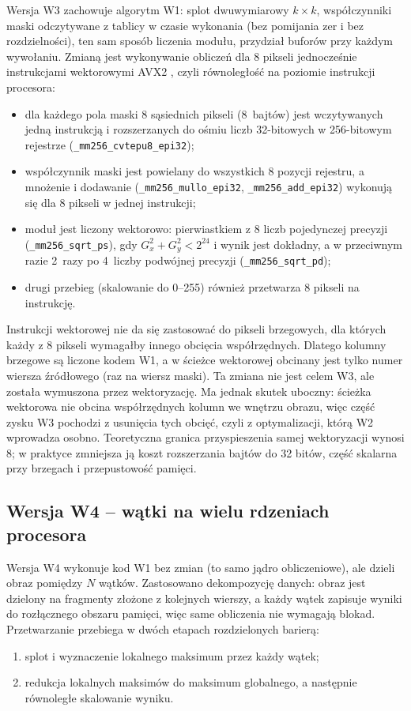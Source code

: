 \documentclass[12pt,a4paper]{article}
\newcommand{\kod}[1]{\texttt{#1}}
\begin{document}
Wersja W3 zachowuje algorytm W1: splot dwuwymiarowy $k \times k$, współczynniki maski odczytywane z tablicy w czasie wykonania (bez pomijania zer i bez rozdzielności), ten sam sposób liczenia modułu, przydział buforów przy każdym wywołaniu. Zmianą jest wykonywanie obliczeń dla 8 pikseli jednocześnie instrukcjami wektorowymi AVX2 \cite{intel}, czyli równoległość na poziomie instrukcji procesora:
\begin{itemize}
	\item dla każdego pola maski 8 sąsiednich pikseli (8~bajtów) jest wczytywanych jedną instrukcją i rozszerzanych do ośmiu liczb 32-bitowych w 256-bitowym rejestrze (\kod{\_mm256\_\allowbreak{}cvtepu8\_epi32});
	\item współczynnik maski jest powielany do wszystkich 8 pozycji rejestru, a mnożenie i dodawanie (\kod{\_mm256\_\allowbreak{}mullo\_epi32}, \kod{\_mm256\_\allowbreak{}add\_epi32}) wykonują się dla 8 pikseli w jednej instrukcji;
	\item moduł jest liczony wektorowo: pierwiastkiem z 8 liczb pojedynczej precyzji (\kod{\_mm256\_\allowbreak{}sqrt\_ps}), gdy $G_x^2 + G_y^2 < 2^{24}$ i wynik jest dokładny, a w przeciwnym razie 2~razy po 4~liczby podwójnej precyzji (\kod{\_mm256\_\allowbreak{}sqrt\_pd});
	\item drugi przebieg (skalowanie do 0--255) również przetwarza 8 pikseli na instrukcję.
\end{itemize}
Instrukcji wektorowej nie da się zastosować do pikseli brzegowych, dla których każdy z 8 pikseli wymagałby innego obcięcia współrzędnych. Dlatego kolumny brzegowe są liczone kodem W1, a w ścieżce wektorowej obcinany jest tylko numer wiersza źródłowego (raz na wiersz maski). Ta zmiana nie jest celem W3, ale została wymuszona przez wektoryzację. Ma jednak skutek uboczny: ścieżka wektorowa nie obcina współrzędnych kolumn we wnętrzu obrazu, więc część zysku W3 pochodzi z usunięcia tych obcięć, czyli z optymalizacji, którą W2 wprowadza osobno. Teoretyczna granica przyspieszenia samej wektoryzacji wynosi 8; w praktyce zmniejsza ją koszt rozszerzania bajtów do 32 bitów, część skalarna przy brzegach i przepustowość pamięci.

\subsection{Wersja W4 -- wątki na wielu rdzeniach procesora}

Wersja W4 wykonuje kod W1 bez zmian (to samo jądro obliczeniowe), ale dzieli obraz pomiędzy $N$ wątków. Zastosowano dekompozycję danych: obraz jest dzielony na fragmenty złożone z kolejnych wierszy, a każdy wątek zapisuje wyniki do rozłącznego obszaru pamięci, więc same obliczenia nie wymagają blokad. Przetwarzanie przebiega w dwóch etapach rozdzielonych barierą:
\begin{enumerate}
	\item splot i wyznaczenie lokalnego maksimum przez każdy wątek;
	\item redukcja lokalnych maksimów do maksimum globalnego, a następnie równoległe skalowanie wyniku.
\end{enumerate}
\end{document}
